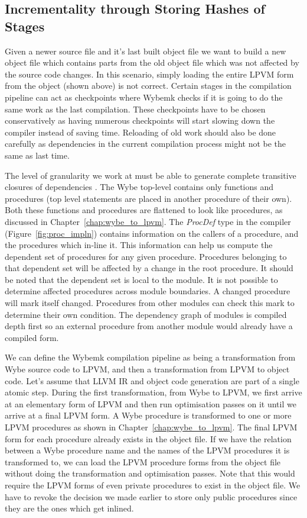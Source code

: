 \subsection{Incrementality through Storing Hashes of Stages}
\label{sssec:incrementality}

Given a newer source file and it's last built object file we want to build a
new object file which contains parts from the old object file which was not
affected by the source code changes. In this scenario, simply loading the
entire LPVM form from the object (shown above) is not correct. Certain stages
in the compilation pipeline can act as checkpoints where Wybemk checks if it is
going to do the same work as the last compilation. These checkpoints have to be
chosen conservatively as having numerous checkpoints will start slowing down
the compiler instead of saving time. Reloading of old work should also be done
carefully as dependencies in the current compilation process might not be the
same as last time.

The level of granularity we work at must be able to generate complete
transitive closures of dependencies \citep{cpp_compiler}. The Wybe top-level
contains only functions and procedures (top level statements are placed in
another procedure of their own). Both these functions and procedures are
flattened to look like procedures, as discussed in
Chapter~\ref{chap:wybe_to_lpvm}. The \textit{ProcDef} type in the compiler
(Figure~\ref{fig:proc_impln}) contains information on the callers of a
procedure, and the procedures which in-line it. This information can help us
compute the dependent set of procedures for any given procedure. Procedures
belonging to that dependent set will be affected by a change in the root
procedure. It should be noted that the dependent set is local to the module. It
is not possible to determine affected procedures across module boundaries. A
changed procedure will mark itself changed. Procedures from other modules can
check this mark to determine their own condition. The dependency graph of
modules is compiled depth first so an external procedure from another module
would already have a compiled form.

We can define the Wybemk compilation pipeline as being a transformation from
Wybe source code to LPVM, and then a transformation from LPVM to object
code. Let's assume that LLVM IR and object code generation are part of a single
atomic step. During the first transformation, from Wybe to LPVM, we first
arrive at an elementary form of LPVM and then run optimisation passes on it
until we arrive at a final LPVM form. A Wybe procedure is transformed to one or
more LPVM procedures as shown in Chapter~\ref{chap:wybe_to_lpvm}. The final
LPVM form for each procedure already exists in the object file. If we have the
relation between a Wybe procedure name and the names of the LPVM procedures it
is transformed to, we can load the LPVM procedure forms from the object file
without doing the transformation and optimisation passes. Note that this would
require the LPVM forms of even private procedures to exist in the object
file. We have to revoke the decision we made earlier to store only public
procedures since they are the ones which get inlined.

